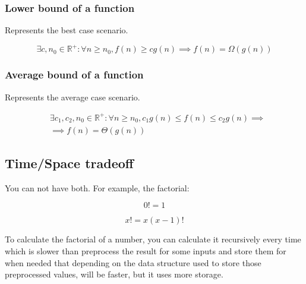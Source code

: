 \documentclass[a4paper,12pt]{article}
\theoremstyle{mytheoremstyle}
\theoremstyle{mytheoremstyle}
\theoremstyle{myproblemstyle}
\begin{document}
    \subsubsection{Lower bound of a function}

    Represents the best case scenario.

    \begin{definition}
        \begin{displaymath}
            \exists c, n_{0} \in \mathbb{R}^{+}: \forall n \ge n_{0}, f \left( n \right) \ge c g \left( n \right) \implies f \left( n \right) = \Omega \left( g \left( n \right) \right)
        \end{displaymath}
        \label{eq:big_omega}
    \end{definition}

    \subsubsection{Average bound of a function}

    Represents the average case scenario.

    \begin{definition}
        \begin{displaymath}
            \begin{split}
                & \exists c_{1}, c_{2}, n_{0} \in \mathbb{R}^{+}: \forall n \ge n_{0}, c_{1} g \left( n \right) \le f \left( n \right) \le c_{2} g \left( n \right) \implies \\
                & \implies f \left( n \right) = \Theta \left( g \left( n \right) \right)
            \end{split}
        \end{displaymath}
        \label{eq:big_theta}
    \end{definition}

    \subsection{Time/Space tradeoff}

    You can not have both. For example, the factorial:

    $$
        0! = 1
    $$

    $$
        x! = x(x-1)!
    $$

    To calculate the factorial of a number, you can calculate it recursively
    every time which is slower than preprocess the result for some inputs and
    store them for when needed that depending on the data structure used to
    store those preprocessed values, will be faster, but it uses more storage.
\end{document}
